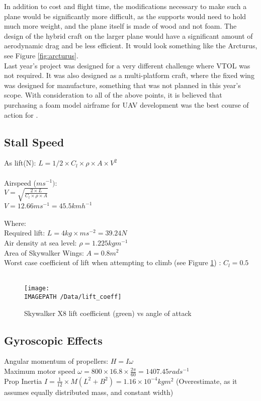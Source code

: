 In addition to cost and flight time, the modifications necessary to make such a plane would be significantly more difficult, as the supports would need to hold much more weight, and the plane itself is made of wood and not foam. The design of the hybrid craft on the larger plane would have a significant amount of aerodynamic drag and be less efficient. It would look something like the Arcturus, see Figure \ref{fig:arcturus}.\\
	
Last year's project was designed for a very different challenge where VTOL was not required. It was also designed as a multi-platform craft, where the fixed wing was designed for manufacture, something that was not planned in this year's scope. With consideration to all of the above points, it is believed that purchasing a foam model airframe for UAV development was the best course of action for \ID.

\subsection{Stall Speed}
\label{sec:stall}
As lift(N): $L = 1/2\times C_l\times\rho\times A\times V^2$\\\\
Airspeed ($ms^{-1})$:\\
$V= \sqrt{\frac{2\times L}{C_l\times \rho \times A}}$\\
$V = 12.66ms^{-1} = 45.5kmh^{-1}$\\\\
Where:\\
Required lift: $L = 4kg \times ms^{-2} = 39.24N$\\
Air density at sea level: $\rho = 1.225 kgm^{-1}$\\
Area of Skywalker Wings: $A = 0.8m^2$\\
Worst case coefficient of lift when attempting to climb (see Figure \ref{fig:lift})  
: $C_l = 0.5$
\\\\
\begin{figure}[!ht]
	\centering
	\texttt{[image: \\IMAGEPATH /Data/lift\_coeff]}
	\caption{Skywalker X8 lift coefficient (green) vs angle of attack}
	\label{fig:lift}
\end{figure}


\subsection{Gyroscopic Effects}
\label{sec:gyro}
Angular momentum of propellers: $H = I\omega$\\
Maximum motor speed $\omega = 800\times16.8\times\frac{2\pi}{60} = 1407.45rads^{-1}$\\
Prop Inertia $I = \frac{1}{12}\times M(L^2+B^2) = 1.16\times10^{-4}kgm^2$ (Overestimate, as it assumes equally distributed mass, and constant width)\\\\

